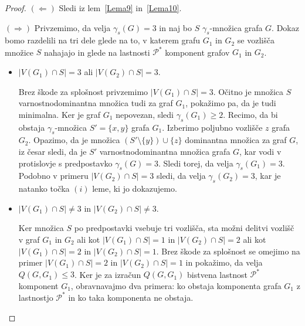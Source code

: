 \documentclass[12pt,a4paper,twoside]{article}
\theoremstyle{definition} %
\theoremstyle{plain} %
\numberwithin{equation}{section}  %
\begin{document}
 \begin{proof}
$(\Leftarrow)$ Sledi iz lem~\ref{Lema9} in~\ref{Lema10}.

\medskip
$(\Rightarrow)$ Privzemimo, da velja $\gamma_s(G) = 3$ in naj bo $S$ $\gamma_s$-množica grafa $G$. Dokaz bomo razdelili na tri dele glede na to, v katerem grafu $G_1$ in $G_2$ se vozlišča množice $S$ nahajajo in glede na lastnosti $\mathcal{P^*}$ komponent grafov $G_1$ in $G_2$.
\begin{itemize}
\item $|V(G_1) \cap S| = 3$ ali $|V(G_2) \cap S| = 3$.

Brez škode za splošnost privzemimo $|V(G_1) \cap S| = 3$. Očitno je množica $S$ varnostnodominantna množica tudi za graf $G_1$, pokažimo pa, da je tudi minimalna. Ker je graf $G_1$ nepovezan, sledi $\gamma_s(G_1) \geq 2$. Recimo, da bi obstaja $\gamma_s$-množica $S' = \{x,y\}$ grafa $G_1$. Izberimo poljubno vozlišče $z$ grafa $G_2$. Opazimo, da je množica $(S' \setminus \{y\}) \cup \{z\}$ dominantna množica za graf $G$, iz česar sledi, da je $S'$ varnostnodominantna množica grafa $G$, kar vodi v protislovje s predpostavko $\gamma_s(G) = 3$. Sledi torej, da velja $\gamma_s(G_1) = 3$. Podobno v primeru $|V(G_2) \cap S| = 3$ sledi, da velja $\gamma_s(G_2) = 3$, kar je natanko točka $(i)$ leme, ki jo dokazujemo.

\item $|V(G_1) \cap S| \neq 3$ in $|V(G_2) \cap S| \neq 3$.

Ker množica $S$ po predpostavki vsebuje tri vozlišča, sta možni delitvi vozlišč v graf $G_1$ in $G_2$ ali kot $|V(G_1) \cap S| = 1$ in $|V(G_2) \cap S| = 2$ ali kot $|V(G_1) \cap S| = 2$ in $|V(G_2) \cap S| = 1$. Brez škode za splošnost se omejimo na primer $|V(G_1) \cap S| = 2$ in $|V(G_2) \cap S| = 1$ in pokažimo, da velja $Q(G, G_1) \leq 3$. Ker je za izračun $Q(G, G_1)$ bistvena lastnost $\mathcal{P^*}$ komponent $G_1$, obravnavajmo dva primera: ko obstaja komponenta grafa $G_1$ z lastnostjo $\mathcal{P^*}$ in ko taka komponenta ne obstaja.


\end{itemize}
\end{proof}
\end{document}
